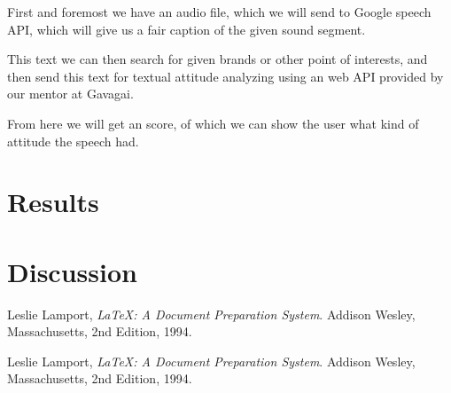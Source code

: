 \documentclass[a4paper,11pt,twoside]{ltxdoc}
\begin{document}
First and foremost we have an audio file, which we will send to Google speech API, which will give us a fair caption of the given sound segment.

This text we can then search for given brands or other point of interests, and then send this text for textual attitude analyzing using an web API provided by our mentor at Gavagai.

From here we will get an score, of which we can show the user what kind of attitude the speech had. 

\section{Results}


\section{Discussion}


\newpage
\begin{thebibliography}{9}

  Leslie Lamport,
  \emph{\LaTeX: A Document Preparation System}.
  Addison Wesley, Massachusetts,
  2nd Edition,
  1994.

  Leslie Lamport,
  \emph{\LaTeX: A Document Preparation System}.
  Addison Wesley, Massachusetts,
  2nd Edition,
  1994.


\end{thebibliography}
\end{document}
